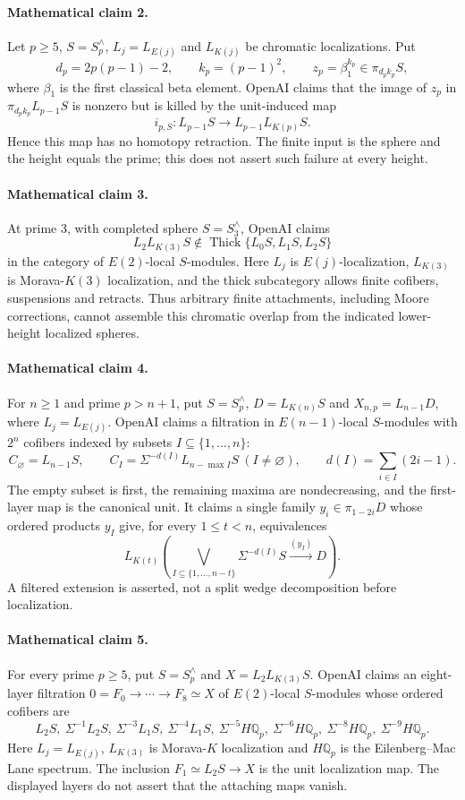 \documentclass[11pt]{article}
\begin{document}
\paragraph{Mathematical claim 2.} Let $p\ge5$, $S=S_p^\wedge$, $L_j=L_{E(j)}$ and $L_{K(j)}$ be chromatic localizations. Put
\[
d_p=2p(p-1)-2,\qquad k_p=(p-1)^2,\qquad z_p=\beta_1^{k_p}\in\pi_{d_pk_p}S,
\]
where $\beta_1$ is the first classical beta element. OpenAI claims that the image of $z_p$ in $\pi_{d_pk_p}L_{p-1}S$ is nonzero but is killed by the unit-induced map
\[
i_{p,S}:L_{p-1}S\longrightarrow L_{p-1}L_{K(p)}S.
\]
Hence this map has no homotopy retraction. The finite input is the sphere and the height equals the prime; this does not assert such failure at every height.

\paragraph{Mathematical claim 3.} At prime $3$, with completed sphere $S=S_3^\wedge$, OpenAI claims
\[
L_2L_{K(3)}S\notin\operatorname{Thick}\{L_0S,L_1S,L_2S\}
\]
in the category of $E(2)$-local $S$-modules. Here $L_j$ is $E(j)$-localization, $L_{K(3)}$ is Morava-$K(3)$ localization, and the thick subcategory allows finite cofibers, suspensions and retracts. Thus arbitrary finite attachments, including Moore corrections, cannot assemble this chromatic overlap from the indicated lower-height localized spheres.

\paragraph{Mathematical claim 4.} For $n\ge1$ and prime $p>n+1$, put $S=S_p^\wedge$, $D=L_{K(n)}S$ and $X_{n,p}=L_{n-1}D$, where $L_j=L_{E(j)}$. OpenAI claims a filtration in $E(n-1)$-local $S$-modules with $2^n$ cofibers indexed by subsets $I\subseteq\{1,\ldots,n\}$:
\[
C_\varnothing=L_{n-1}S,\qquad C_I=\Sigma^{-d(I)}L_{n-\max I}S\ (I\ne\varnothing),\qquad d(I)=\sum_{i\in I}(2i-1).
\]
The empty subset is first, the remaining maxima are nondecreasing, and the first-layer map is the canonical unit. It claims a single family $y_i\in\pi_{1-2i}D$ whose ordered products $y_I$ give, for every $1\le t<n$, equivalences
\[
L_{K(t)}\left(\bigvee_{I\subseteq\{1,\ldots,n-t\}}\Sigma^{-d(I)}S\xrightarrow{(y_I)}D\right).
\]
A filtered extension is asserted, not a split wedge decomposition before localization.

\paragraph{Mathematical claim 5.} For every prime $p\ge5$, put $S=S_p^\wedge$ and $X=L_2L_{K(3)}S$. OpenAI claims an eight-layer filtration $0=F_0\to\cdots\to F_8\simeq X$ of $E(2)$-local $S$-modules whose ordered cofibers are
\[
L_2S,\ \Sigma^{-1}L_2S,\ \Sigma^{-3}L_1S,\ \Sigma^{-4}L_1S,\
\Sigma^{-5}H\mathbb Q_p,\ \Sigma^{-6}H\mathbb Q_p,\ \Sigma^{-8}H\mathbb Q_p,\ \Sigma^{-9}H\mathbb Q_p.
\]
Here $L_j=L_{E(j)}$, $L_{K(3)}$ is Morava-$K$ localization and $H\mathbb Q_p$ is the Eilenberg--Mac Lane spectrum. The inclusion $F_1\simeq L_2S\to X$ is the unit localization map. The displayed layers do not assert that the attaching maps vanish.
\end{document}
